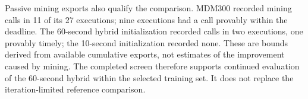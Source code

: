 Passive mining exports also qualify the comparison. MDM300 recorded mining
calls in 11 of its 27 executions; nine executions had a call provably within
the deadline. The 60-second hybrid initialization recorded calls in two
executions, one provably timely; the 10-second initialization recorded none.
These are bounds derived from available cumulative exports, not estimates
of the improvement caused by mining. The completed screen therefore supports
continued evaluation of the 60-second hybrid within the selected training
set. It does not replace the iteration-limited reference comparison.
